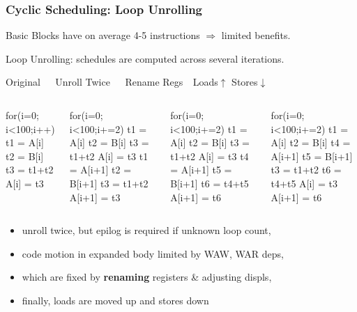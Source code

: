 \documentclass[rgb,dvipsnames]{beamer}
\renewcommand{\emph}[1]{\textcolor{structure}{#1}}
\newcommand{\emp}[1]{\textcolor{DikuRed}{ #1}}
\newcommand{\emphh}[1]{\textcolor{CosGreen}{ #1}}
\begin{document}
\begin{frame}[fragile,t]
    \frametitle{Cyclic Scheduling: Loop Unrolling}

Basic Blocks have on average 4-5 instructions $\Rightarrow$ limited benefits.
\smallskip

Loop Unrolling: schedules are computed across several iterations.

\begin{block}{Original{\tt~~~}Unroll Twice{\tt~~~}Rename Regs{\tt~~}Loads$\uparrow$ Stores$\downarrow$}
\begin{columns}
\begin{colorcode}[fontsize=\scriptsize]
for(i=0;
i<100;i++)
  t1 = A[i]
  t2 = B[i]
  t3 = t1+t2
  A[i] = t3
\end{colorcode} 
\begin{colorcode}[fontsize=\scriptsize]
for(i=0;
i<100;i+=2)
  t1 = A[i]
  t2 = B[i]
  t3 = t1+t2
  A[i] = t3
  \emp{t1 = A[i+1]}
  \emp{t2 = B[i+1]}
  \emp{t3 = t1+t2}
  \emp{A[i+1] = t3}
\end{colorcode} 
\begin{colorcode}[fontsize=\scriptsize]
for(i=0;
i<100;i+=2)
  t1 = A[i]
  t2 = B[i]
  t3 = t1+t2
  \emp{A[i] = t3}
  \emphh{t4} = \emp{A[i+1]}
  \emphh{t5} = \emp{B[i+1]}
  \emphh{t6} = t4+t5
  A[i+1] = \emphh{t6}
\end{colorcode} 
\begin{colorcode}[fontsize=\scriptsize]
for(i=0;
i<100;i+=2)
  t1 = \emphh{A[i]}
  t2 = \emphh{B[i]}
  t4 = \emphh{A[i+1]}
  t5 = \emphh{B[i+1]}
  t3 = t1+t2
  t6 = t4+t5
  \emphh{A[i]} = t3
  \emphh{A[i+1]} = t6
\end{colorcode} 
\end{columns}
\end{block}
\smallskip \pause

\begin{itemize}
    \item unroll twice, but epilog is required if unknown loop count,
    \item code motion in expanded body limited by WAW, WAR deps,
    \item which are fixed by {\bf \emph{renaming}} registers \& adjusting displs,
    \item finally, loads are moved up and stores down
\end{itemize}

\end{frame}
\end{document}
